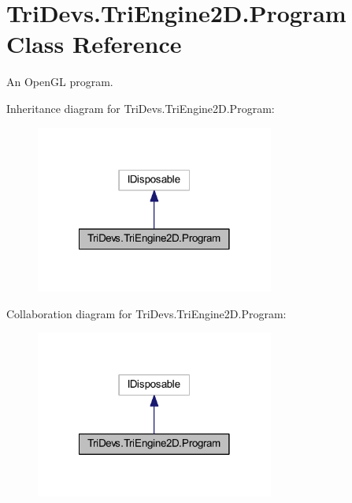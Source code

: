 \hypertarget{class_tri_devs_1_1_tri_engine2_d_1_1_program}{\section{Tri\-Devs.\-Tri\-Engine2\-D.\-Program Class Reference}
\label{class_tri_devs_1_1_tri_engine2_d_1_1_program}
}


An Open\-G\-L program.  




Inheritance diagram for Tri\-Devs.\-Tri\-Engine2\-D.\-Program\-:\nopagebreak
\begin{figure}[H]
\begin{center}
\leavevmode
\includegraphics[width=222pt]{class_tri_devs_1_1_tri_engine2_d_1_1_program__inherit__graph}
\end{center}
\end{figure}


Collaboration diagram for Tri\-Devs.\-Tri\-Engine2\-D.\-Program\-:\nopagebreak
\begin{figure}[H]
\begin{center}
\leavevmode
\includegraphics[width=222pt]{class_tri_devs_1_1_tri_engine2_d_1_1_program__coll__graph}
\end{center}
\end{figure}
